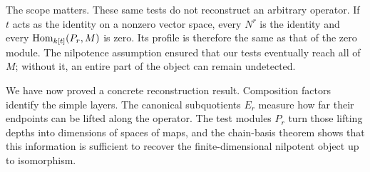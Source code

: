 The scope matters. These same tests do not reconstruct an arbitrary
operator. If $t$ acts as the identity on a nonzero vector space, every
$N^r$ is the identity and every $\operatorname{Hom}_{k[t]}(P_r,M)$ is zero. Its profile
is therefore the same as that of the zero module. The nilpotence
assumption ensured that our tests eventually reach all of $M$; without
it, an entire part of the object can remain undetected.

We have now proved a concrete reconstruction result. Composition factors
identify the simple layers. The canonical subquotients $E_r$ measure how
far their endpoints can be lifted along the operator. The test modules
$P_r$ turn those lifting depths into dimensions of spaces of maps, and the
chain-basis theorem shows that this information is sufficient to recover
the finite-dimensional nilpotent object up to isomorphism.
